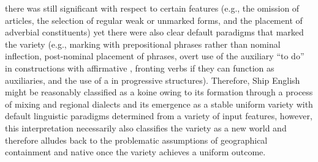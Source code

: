there was still significant  with respect to certain features (e.g., the omission of articles, the selection of regular weak or unmarked  forms, and the placement of adverbial constituents) yet there were also clear default paradigms that marked the variety (e.g., marking  with prepositional phrases rather than nominal inflection, post-nominal placement of  phrases, overt use of the auxiliary “to do” in constructions with affirmative , fronting verbs if they can function as auxiliaries, and the use of a   in progressive structures). Therefore, Ship English might be reasonably classified as a koine owing to its formation through a process of mixing and  regional dialects and its emergence as a stable uniform variety with default linguistic paradigms determined from a variety of input features, however, this interpretation necessarily also classifies the variety as a new world  and therefore alludes back to the problematic assumptions of geographical containment and native  once the variety achieves a uniform outcome. 

